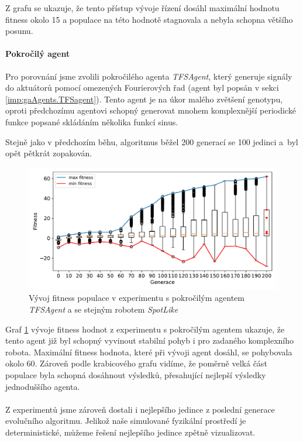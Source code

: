 Z grafu se ukazuje, že tento přístup vývoje řízení dosáhl maximální hodnotu
fitness okolo 15 a populace na této hodnotě stagnovala a nebyla schopna většího
posunu.

\paragraph{Pokročilý agent}
Pro porovnání jsme zvolili pokročilého agenta \emph{TFSAgent}, který generuje
signály do aktuátorů pomocí omezených Fourierových řad (agent byl popsán v
sekci \ref{imp:gaAgents.TFSagent}). Tento agent je na úkor malého zvětšení
genotypu, oproti předchozímu agentovi schopný generovat mnohem komplexnější
periodické funkce popsané skládáním několika funkcí sinus.

Stejně jako v předchozím běhu, algoritmus běžel 200 generací se 100 jedinci
a~byl opět pětkrát zopakován.

\begin{figure}[!h]
    \centering
    \includegraphics[width=1\textwidth]{../img/experiment1_TFS_10ticks.pdf}
    \caption{Vývoj fitness populace v experimentu s pokročilým agentem
    \emph{TFSAgent} a se stejným robotem \emph{SpotLike}}
    \label{exp:first_TFS}
\end{figure}

Graf \ref{exp:first_TFS} vývoje fitness hodnot z experimentu s pokročilým
agentem ukazuje, že tento agent již byl schopný vyvinout stabilní pohyb i pro
zadaného komplexního robota. Maximální fitness hodnota, které při vývoji agent
dosáhl, se pohybovala okolo 60. Zároveň podle krabicového grafu vidíme, že
poměrně velká část populace byla schopná dosáhnout výsledků, přesahující
nejlepší výsledky jednoduššího agenta.

\paragraph{}
Z experimentů jsme zároveň dostali i nejlepšího jedince z poslední generace
evolučního algoritmu. Jelikož naše simulované fyzikální prostředí je
deterministické, můžeme řešení nejlepšího jedince zpětně vizualizovat.

